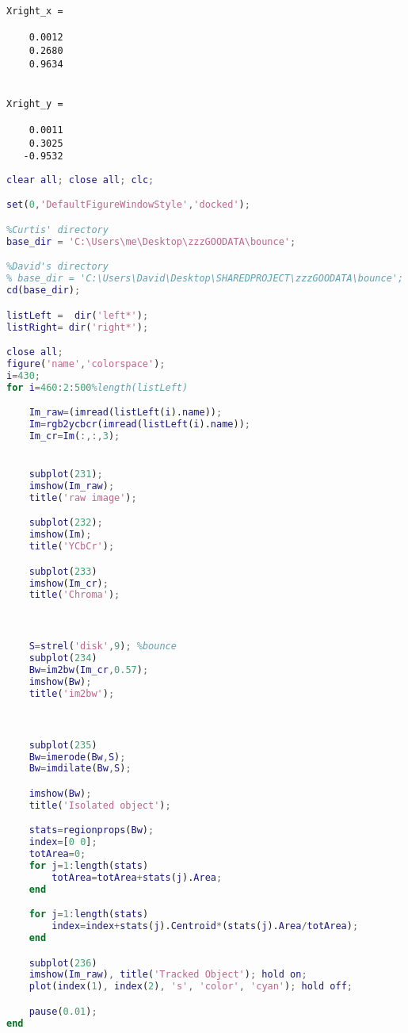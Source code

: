 \documentclass{IEEEtran}
\begin{document}
         { \small \begin{verbatim}
Xright_x =

    0.0012
    0.2680
    0.9634


Xright_y =

    0.0011
    0.3025
   -0.9532

\end{verbatim} \color{black} }




\begin{lstlisting}[caption={MATLAB Object Isolation Code},label={lst:isolationCode},language=MATLAB]
clear all; close all; clc;

set(0,'DefaultFigureWindowStyle','docked');

%Curtis' directory
base_dir = 'C:\Users\me\Desktop\zzzGOODATA\bounce';

%David's directory
% base_dir = 'C:\Users\David\Desktop\SHAREDPROJECT\zzzGOODATA\bounce';
cd(base_dir);

listLeft =  dir('left*');
listRight= dir('right*');

close all;
figure('name','colorspace');
i=430;
for i=460:2:500%length(listLeft)

    Im_raw=(imread(listLeft(i).name));
    Im=rgb2ycbcr(imread(listLeft(i).name));
    Im_cr=Im(:,:,3);


    subplot(231);
    imshow(Im_raw);
    title('raw image');

    subplot(232);
    imshow(Im);
    title('YCbCr');

    subplot(233)
    imshow(Im_cr);
    title('Chroma');



    S=strel('disk',9); %bounce
    subplot(234)
    Bw=im2bw(Im_cr,0.57);
    imshow(Bw);
    title('im2bw');



    subplot(235)
    Bw=imerode(Bw,S);
    Bw=imdilate(Bw,S);

    imshow(Bw);
    title('Isolated object');

    stats=regionprops(Bw);
    index=[0 0];
    totArea=0;
    for j=1:length(stats)
        totArea=totArea+stats(j).Area;
    end

    for j=1:length(stats)
        index=index+stats(j).Centroid*(stats(j).Area/totArea);
    end

    subplot(236)
    imshow(Im_raw), title('Tracked Object'); hold on;
    plot(index(1), index(2), 's', 'color', 'cyan'); hold off;

    pause(0.01);
end
\end{lstlisting}
\end{document}
